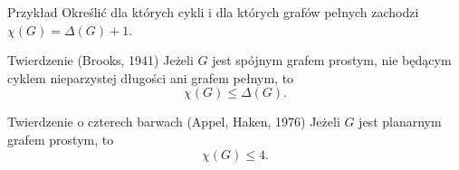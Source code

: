 \documentclass[a4paper,10pt]{beamer}
\begin{document}
\begin{frame}
\begin{exampleblock}{Przykład}
Określić dla których cykli i dla których grafów pełnych zachodzi $\chi(G)=\Delta(G)+1$.
\end{exampleblock}
\end{frame}


\begin{frame}

\begin{block}{Twierdzenie (Brooks, 1941)}
	Jeżeli $G$ jest spójnym grafem prostym, nie będącym cyklem nieparzystej długości ani grafem pełnym, to $$\chi(G)\leqslant\Delta(G).$$
\end{block}

\end{frame}



\begin{frame}

\begin{block}{Twierdzenie o czterech barwach (Appel, Haken, 1976)}
Jeżeli $G$ jest planarnym grafem prostym, to $$\chi(G)\leqslant4.$$
\end{block}


\end{frame}
\end{document}
